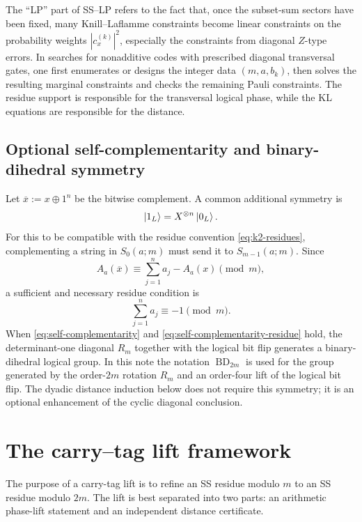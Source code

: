 \documentclass[11pt]{article}
\newcommand{\BD}{\operatorname{BD}}
\newcommand{\ov}[1]{\overline{#1}}
\begin{document}
The ``LP'' part of SS--LP refers to the fact that, once the subset-sum sectors have been fixed,
many Knill--Laflamme constraints become linear constraints on the probability weights
$|c_x^{(k)}|^2$, especially the constraints from diagonal $Z$-type errors.  In searches for
nonadditive codes with prescribed diagonal transversal gates, one first enumerates or designs the
integer data $(m,a,b_k)$, then solves the resulting marginal constraints and checks the remaining
Pauli constraints.  The residue support is responsible for the transversal logical phase, while the
KL equations are responsible for the distance.

\subsection{Optional self-complementarity and binary-dihedral symmetry}

Let $\ov{x}:=x\oplus 1^n$ be the bitwise complement.  A common additional symmetry is
\begin{equation}
  \ket{1_L}=X^{\otimes n}\ket{0_L}.
  \label{eq:self-complementarity}
\end{equation}
For this to be compatible with the residue convention \eqref{eq:k2-residues}, complementing a
string in $S_0(a;m)$ must send it to $S_{m-1}(a;m)$.  Since
\[
  A_a(\ov{x})\equiv \sum_{j=1}^n a_j-A_a(x)\pmod m,
\]
a sufficient and necessary residue condition is
\begin{equation}
  \sum_{j=1}^n a_j\equiv -1\pmod m.
  \label{eq:self-complementarity-residue}
\end{equation}
When \eqref{eq:self-complementarity} and \eqref{eq:self-complementarity-residue} hold, the
determinant-one diagonal $R_m$ together with the logical bit flip generates a binary-dihedral
logical group.  In this note the notation $\BD_{2m}$ is used for the group generated by the
order-$2m$ rotation $R_m$ and an order-four lift of the logical bit flip.  The dyadic distance
induction below does not require this symmetry; it is an optional enhancement of the cyclic
diagonal conclusion.

\section{The carry--tag lift framework}
\label{sec:carry-tag-template}

The purpose of a carry-tag lift is to refine an SS residue modulo $m$ to an SS residue modulo
$2m$.  The lift is best separated into two parts: an arithmetic phase-lift statement and an
independent distance certificate.
\end{document}
